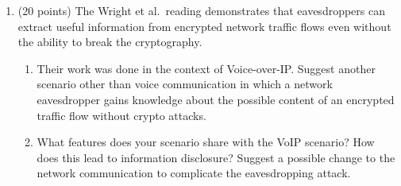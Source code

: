 \documentclass[letterpaper]{article}
\begin{document}
\begin{enumerate}
\item (20 points) The Wright et al.\ reading demonstrates that eavesdroppers can extract useful information from encrypted network traffic flows even without the ability to break the cryptography.
\begin{enumerate}
\item Their work was done in the context of Voice-over-IP. Suggest another scenario other than voice communication in which a network eavesdropper gains knowledge about the possible content of an encrypted traffic flow without crypto attacks.
\item What features does your scenario share with the VoIP scenario? How does this lead to information disclosure? Suggest a possible change to the network communication to complicate the eavesdropping attack.
\end{enumerate}

\end{enumerate}
\end{document}
